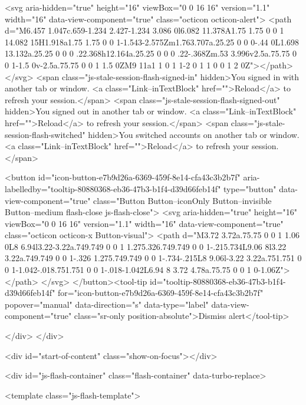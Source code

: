         <svg aria-hidden="true" height="16" viewBox="0 0 16 16" version="1.1" width="16" data-view-component="true" class="octicon octicon-alert">
    <path d="M6.457 1.047c.659-1.234 2.427-1.234 3.086 0l6.082 11.378A1.75 1.75 0 0 1 14.082 15H1.918a1.75 1.75 0 0 1-1.543-2.575Zm1.763.707a.25.25 0 0 0-.44 0L1.698 13.132a.25.25 0 0 0 .22.368h12.164a.25.25 0 0 0 .22-.368Zm.53 3.996v2.5a.75.75 0 0 1-1.5 0v-2.5a.75.75 0 0 1 1.5 0ZM9 11a1 1 0 1 1-2 0 1 1 0 0 1 2 0Z"></path>
</svg>
        <span class="js-stale-session-flash-signed-in" hidden>You signed in with another tab or window. <a class="Link--inTextBlock" href="">Reload</a> to refresh your session.</span>
        <span class="js-stale-session-flash-signed-out" hidden>You signed out in another tab or window. <a class="Link--inTextBlock" href="">Reload</a> to refresh your session.</span>
        <span class="js-stale-session-flash-switched" hidden>You switched accounts on another tab or window. <a class="Link--inTextBlock" href="">Reload</a> to refresh your session.</span>

    <button id="icon-button-e7b9d26a-6369-459f-8e14-cfa43c3b2b7f" aria-labelledby="tooltip-80880368-eb36-47b3-b1f4-d39d66feb14f" type="button" data-view-component="true" class="Button Button--iconOnly Button--invisible Button--medium flash-close js-flash-close">  <svg aria-hidden="true" height="16" viewBox="0 0 16 16" version="1.1" width="16" data-view-component="true" class="octicon octicon-x Button-visual">
    <path d="M3.72 3.72a.75.75 0 0 1 1.06 0L8 6.94l3.22-3.22a.749.749 0 0 1 1.275.326.749.749 0 0 1-.215.734L9.06 8l3.22 3.22a.749.749 0 0 1-.326 1.275.749.749 0 0 1-.734-.215L8 9.06l-3.22 3.22a.751.751 0 0 1-1.042-.018.751.751 0 0 1-.018-1.042L6.94 8 3.72 4.78a.75.75 0 0 1 0-1.06Z"></path>
</svg>
</button><tool-tip id="tooltip-80880368-eb36-47b3-b1f4-d39d66feb14f" for="icon-button-e7b9d26a-6369-459f-8e14-cfa43c3b2b7f" popover="manual" data-direction="s" data-type="label" data-view-component="true" class="sr-only position-absolute">Dismiss alert</tool-tip>


  
</div>
    </div>

  <div id="start-of-content" class="show-on-focus"></div>








    <div id="js-flash-container" class="flash-container" data-turbo-replace>




  <template class="js-flash-template">
    
